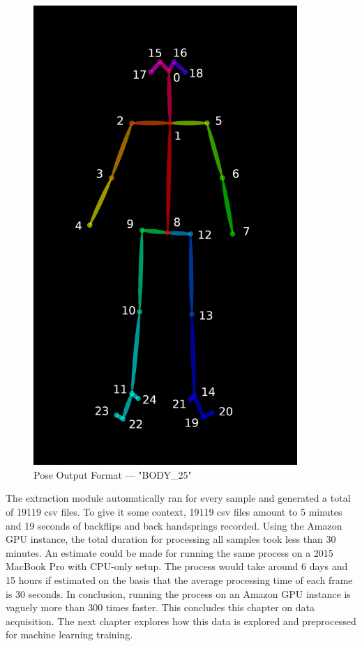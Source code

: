 \begin{figure}
    \centering
    \includegraphics[width=10cm]{images/data-acquisition/keypoints-pose-25.png}
    \caption{Pose Output Format --- "BODY\_25"}
    \label{pose-output-format}
\end{figure}


The extraction module automatically ran for every sample and generated a total of 19119 csv files. To give it some context, 19119 csv files amount to 5 minutes and 19 seconds of backflips and back handsprings recorded. Using the Amazon GPU instance, the total duration for processing all samples took less than 30 minutes. An estimate could be made for running the same process on a 2015 MacBook Pro with CPU-only setup. The process would take around 6 days and 15 hours if estimated on the basis that the average processing time of each frame is 30 seconds. In conclusion, running the process on an Amazon GPU instance is vaguely more than 300 times faster. This concludes this chapter on data acquisition. The next chapter explores how this data is explored and preprocessed for machine learning training.




















